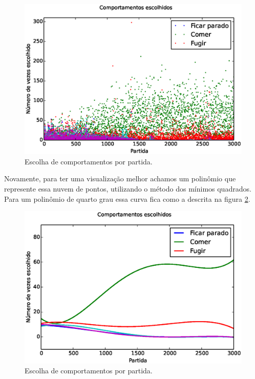 \begin{figure}[H]
    \centering
    \includegraphics[width=\linewidth]{images/5_behaviors_small_map/chosen_behaviors}
    \caption{Escolha de comportamentos por partida.}
    \label{img:5ComportamentosMapaPequeno:ComportamentosEscolhidos}
\end{figure}

Novamente, para ter uma visualização melhor achamos um polinômio que represente essa nuvem de pontos, utilizando o método dos mínimos quadrados. Para um polinômio de quarto grau essa curva fica como a descrita na figura \ref{img:5ComportamentosMapaPequeno:ComportamentosEscolhidosPolinômio}.

\begin{figure}[H]
    \centering
    \includegraphics[width=\linewidth]{images/5_behaviors_small_map/chosen_behaviors_pol}
    \caption{Escolha de comportamentos por partida.}
    \label{img:5ComportamentosMapaPequeno:ComportamentosEscolhidosPolinômio}
\end{figure}

